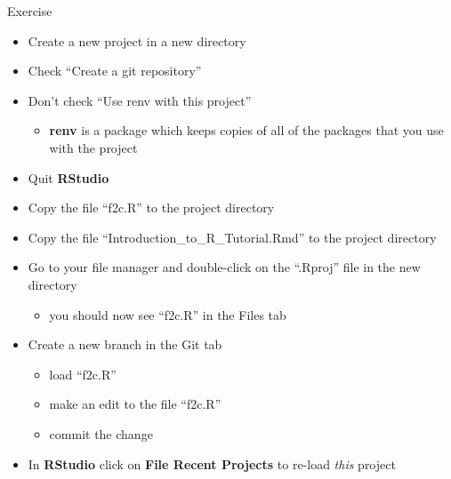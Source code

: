 \documentclass[
  ignorenonframetext,
  aspectratio=169]{beamer}
\providecommand{\tightlist}{%
  \setlength{\itemsep}{0pt}\setlength{\parskip}{0pt}}
\begin{document}
\begin{frame}{Exercise}
\protect\hypertarget{exercise}{}
\begin{itemize}
\tightlist
\item
  Create a new project in a new directory
\item
  Check ``Create a git repository''
\item
  Don't check ``Use renv with this project''

  \begin{itemize}
  \tightlist
  \item
    \textbf{renv} is a package which keeps copies of all of the packages
    that you use with the project
  \end{itemize}
\item
  Quit \textbf{RStudio}
\item
  Copy the file ``f2c.R'' to the project directory
\item
  Copy the file ``Introduction\_to\_R\_Tutorial.Rmd'' to the project
  directory
\item
  Go to your file manager and double-click on the ``.Rproj'' file in the
  new directory

  \begin{itemize}
  \tightlist
  \item
    you should now see ``f2c.R'' in the Files tab
  \end{itemize}
\item
  Create a new branch in the Git tab

  \begin{itemize}
  \tightlist
  \item
    load ``f2c.R''
  \item
    make an edit to the file ``f2c.R''
  \item
    commit the change
  \end{itemize}
\item
  In \textbf{RStudio} click on \textbf{File \textbar{} Recent Projects}
  to re-load \emph{this} project
\end{itemize}
\end{frame}
\end{document}
